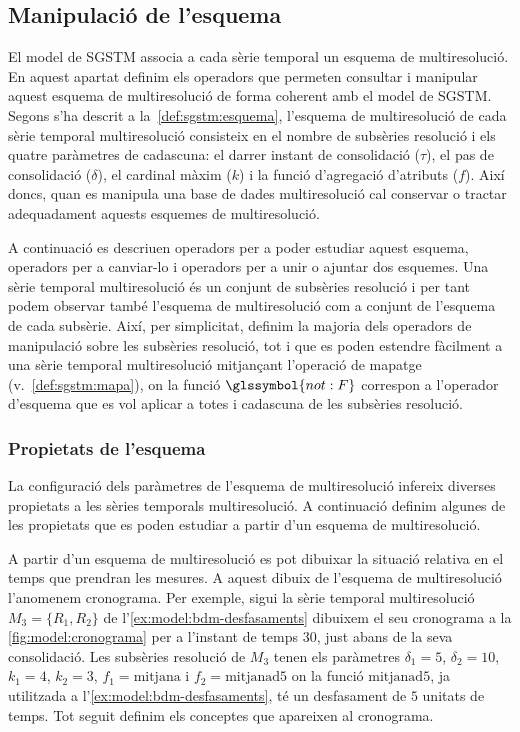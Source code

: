 \subsection{Manipulació de l'esquema}
\label{sec:model:sgstm-manipulacio-esquema}


El model de \gls{SGSTM} associa a cada sèrie temporal un esquema de
multiresolució. En aquest apartat definim els operadors que permeten
consultar i manipular aquest esquema de multiresolució de forma
coherent amb el model de \gls{SGSTM}.
Segons s'ha descrit a la~\autoref{def:sgstm:esquema}, l'esquema de
multiresolució de cada sèrie temporal multiresolució consisteix en el
nombre de subsèries resolució i els quatre paràmetres de cadascuna: el
darrer instant de consolidació ($\tau$), el pas de consolidació
($\delta$), el cardinal màxim ($k$) i la funció d'agregació d'atributs
($f$).  Així doncs, quan es manipula una base de dades multiresolució
cal conservar o tractar adequadament aquests esquemes de
multiresolució.


A continuació es descriuen operadors per a poder estudiar aquest
esquema, operadors per a canviar-lo i operadors per a unir o ajuntar
dos esquemes.  Una sèrie temporal multiresolució és un conjunt de
subsèries resolució i per tant podem observar també l'esquema de
multiresolució com a conjunt de l'esquema de cada subsèrie.  Així, per
simplicitat, definim la majoria dels operadors de manipulació sobre
les subsèries resolució, tot i que es poden estendre fàcilment a una sèrie
temporal multiresolució mitjançant l'operació de mapatge
(v.~\autoref{def:sgstm:mapa}), on la funció $\glssymbol{not:F}$
correspon a l'operador d'esquema que es vol aplicar a totes i
cadascuna de les subsèries resolució.




\subsubsection{Propietats de l'esquema}


La configuració dels paràmetres de l'esquema de multiresolució
infereix diverses propietats a les sèries temporals multiresolució. A
continuació definim algunes de les propietats que es poden estudiar a
partir d'un esquema de multiresolució.


A partir d'un esquema de multiresolució es pot dibuixar la situació
relativa en el temps que prendran les mesures. A aquest dibuix de
l'esquema de multiresolució l'anomenem cronograma. Per exemple, sigui
la sèrie temporal multiresolució $M_3=\{R_1,R_2\}$ de
l'\autoref{ex:model:bdm-desfasaments} dibuixem el seu cronograma a la
\autoref{fig:model:cronograma} per a l'instant de temps $30$, just
abans de la seva consolidació. Les subsèries resolució de $M_3$ tenen
els paràmetres $\delta_1=5$, $\delta_2=10$, $k_1=4$, $k_2=3$,
$f_1=\text{mitjana}$ i $f_2=\text{mitjanad5}$ on la funció
$\text{mitjanad5}$, ja utilitzada a
l'\autoref{ex:model:bdm-desfasaments}, té un desfasament de $5$
unitats de temps. Tot seguit definim els conceptes que apareixen al
cronograma.

